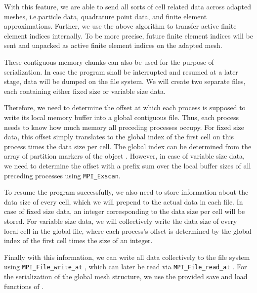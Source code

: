 

With this feature, we are able to send all sorts of cell related data across adapted meshes, i.e.\@ particle data, quadrature point data, and finite element approximations. Further, we use the above algorithm to transfer active finite element indices internally. To be more precise, future finite element indices will be sent and unpacked as active finite element indices on the adapted mesh.

These contiguous memory chunks can also be used for the purpose of serialization. In case the program shall be interrupted and resumed at a later stage, data will be dumped on the file system. We will create two separate files, each containing either fixed size or variable size data.

Therefore, we need to determine the offset at which each process is supposed to write its local memory buffer into a global contiguous file. Thus, each process needs to know how much memory all preceding processes occupy. For fixed size data, this offset simply translates to the global index of the first cell on this process times the data size per cell. The global index can be determined from the array of partition markers of the \pforest{} object \parencite{burstedde2018}. However, in case of variable size data, we need to determine the offset with a prefix sum over the local buffer sizes of all preceding processes using \texttt{MPI\_Exscan}.

To resume the program successfully, we also need to store information about the data size of every cell, which we will prepend to the actual data in each file. In case of fixed size data, an integer corresponding to the data size per cell will be stored. For variable size data, we will collectively write the data size of every local cell in the global file, where each process's offset is determined by the global index of the first cell times the size of an integer.

Finally with this information, we can write all data collectively to the file system using \texttt{MPI\_File\_write\_at} \textcite{mpi31}, which can later be read via \texttt{MPI\_File\_read\_at} \textcite{mpi31}. For the serialization of the global mesh structure, we use the provided save and load functions of \pforest{}.

